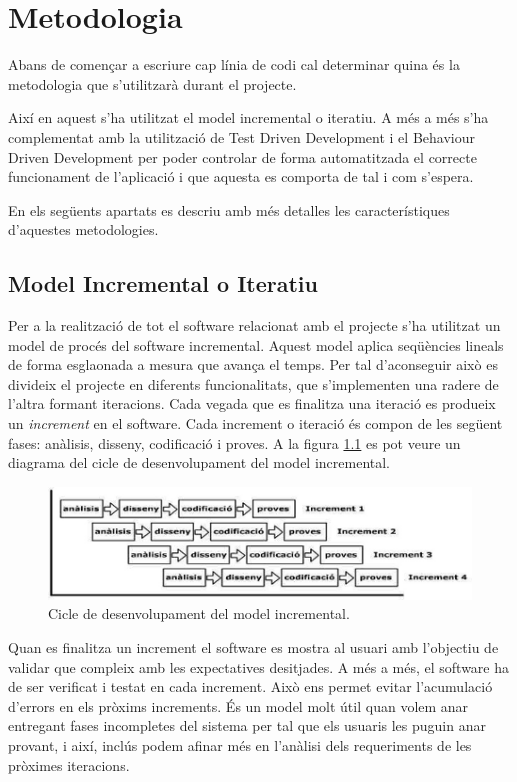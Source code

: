 \chapter{Metodologia}
\label{chap:metodologia}

Abans de començar a escriure cap línia de codi cal determinar quina és la metodologia que s'utilitzarà durant el projecte. 

Així en aquest s'ha utilitzat el model incremental o iteratiu. A més a més s'ha complementat amb la utilització de Test Driven Development i el Behaviour Driven Development per poder controlar de forma automatitzada el correcte funcionament de l'aplicació i que aquesta es comporta de tal i com s'espera.

En els següents apartats es descriu amb més detalles les característiques d'aquestes metodologies.  

\section{Model Incremental o Iteratiu}

Per a la realització de tot el software relacionat amb el projecte s’ha utilitzat un model de procés del software incremental. Aquest model aplica seqüències lineals de forma esglaonada a mesura que avança el temps. Per tal d'aconseguir això es divideix el projecte en diferents funcionalitats, que s'implementen una radere de l'altra formant iteracions. Cada vegada que es finalitza una iteració es produeix un \emph{increment} en el software. Cada increment o iteració és compon de les següent fases: anàlisis, disseny, codificació i proves. A la figura \ref{fig:mii} es pot veure un diagrama del cicle de desenvolupament del model incremental.

\begin{figure}[htbp]
\centering\includegraphics[width=12cm]{img/model-incremental.png}
\caption{Cicle de desenvolupament del model incremental.}
\label{fig:mii}
\end{figure} 

Quan es finalitza un increment el software es mostra al usuari amb l'objectiu de validar que compleix amb les expectatives desitjades. A més a més, el software ha de ser verificat i testat en cada increment. Això ens permet evitar l'acumulació d'errors en els pròxims increments. És un model molt útil quan volem anar entregant fases incompletes del sistema per tal que els usuaris les puguin anar provant, i així, inclús podem afinar més en l’anàlisi dels requeriments de les pròximes iteracions.

